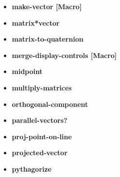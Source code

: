 \documentclass [11pt]{book}
\begin{document}
\begin{itemize}
\item {}
\label{prim:make-vector}
\textbf{make-vector [Macro]}





\item {}
\label{prim:matrix*vector}
\textbf{matrix*vector}





\item {}
\label{prim:matrix-to-quaternion}
\textbf{matrix-to-quaternion}





\item {}
\label{prim:merge-display-controls}
\textbf{merge-display-controls [Macro]}





\item {}
\label{prim:midpoint}
\textbf{midpoint}





\item {}
\label{prim:multiply-matrices}
\textbf{multiply-matrices}





\item {}
\label{prim:orthogonal-component}
\textbf{orthogonal-component}





\item {}
\label{prim:parallel-vectors?}
\textbf{parallel-vectors?}





\item {}
\label{prim:proj-point-on-line}
\textbf{proj-point-on-line}





\item {}
\label{prim:projected-vector}
\textbf{projected-vector}





\item {}
\label{prim:pythagorize}
\textbf{pythagorize}






\end{itemize}
\end{document}
